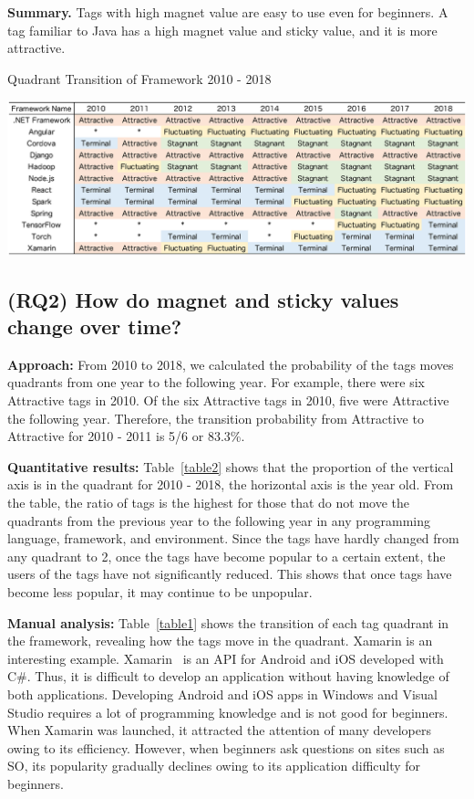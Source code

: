\documentclass[english,preprint,JIP,technote]{ipsj}
\begin{document}
\noindent \textbf{Summary.}
 Tags with high magnet value are easy to use even for beginners. A tag familiar to Java has a high magnet value and sticky value, and it is more attractive.

\begin{table}[t]
 \centering
 \caption{Quadrant Transition of Framework 2010 - 2018} 
 \includegraphics[width=1.0\hsize]{img/frame2010-2018.eps} 
 \label{table1} 
\end{table}

\subsection{(RQ2) How do magnet and sticky values change over time?} 

\noindent \textbf{Approach:}
From 2010 to 2018, we calculated the probability of the tags moves quadrants from one year to the following year. For example, there were six Attractive tags in 2010. Of the six Attractive tags in 2010, five were Attractive the following year. Therefore, the transition probability from Attractive to Attractive for 2010 - 2011 is 5/6 or 83.3\%. 

\noindent \textbf{Quantitative results:}
Table~\ref{table2} shows that the proportion of the vertical axis is in the quadrant for 2010 - 2018, the horizontal axis is the year old. From the table, the ratio of tags is the highest for those that do not move the quadrants from the previous year to the following year in any programming language, framework, and environment. Since the tags have hardly changed from any quadrant to 2, once the tags have become popular to a certain extent, the users of the tags have not significantly reduced. This shows that once tags have become less popular, it may continue to be unpopular.

\noindent \textbf{Manual analysis:}
Table~\ref{table1} shows the transition of each tag quadrant in the framework, revealing how the tags move in the quadrant. Xamarin is an interesting example. Xamarin~\cite{reynolds2014xamarin} is an API for Android and iOS developed with C\#. Thus, it is difficult to develop an application without having knowledge of both applications. Developing Android and iOS apps in Windows and Visual Studio requires a lot of programming knowledge and is not good for beginners. When Xamarin was launched, it attracted the attention of many developers owing to its efficiency. However, when beginners ask questions on sites such as SO, its popularity gradually declines owing to its application difficulty for beginners.
\end{document}

